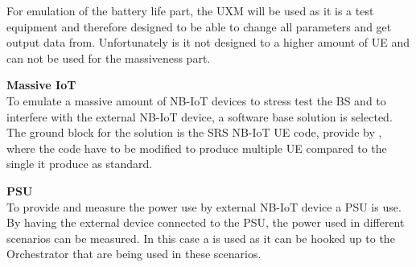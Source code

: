 For emulation of the battery life part, the \gls{UXM} will be used as it is a test equipment and therefore designed to be able to change all parameters and get output data from. Unfortunately is it not designed to a higher amount of UE and can not be used for the massiveness part.


\textbf{Massive IoT}\\
To emulate a massive amount of NB-IoT devices to stress test the BS and to interfere with the external NB-IoT device, a software base solution is selected. The ground block for the solution is the SRS NB-IoT UE code, provide by , where the code have to be modified to produce multiple UE compared to the single it produce as standard.


\textbf{PSU}\\
To provide and measure the power use by external NB-IoT device a \gls{PSU} is use. By having the external device connected to the PSU, the power used in different scenarios can be measured. In this case a  is used as it can be hooked up to the Orchestrator that are being used in these scenarios.

